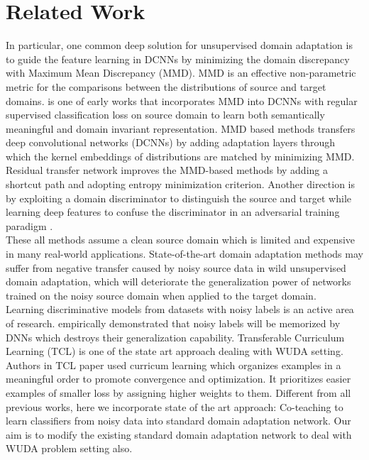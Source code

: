 \section{Related Work}
In particular, one common deep solution for unsupervised domain adaptation is to guide the feature learning in DCNNs by minimizing the domain discrepancy with Maximum Mean Discrepancy (MMD). MMD is an effective non-parametric metric for the comparisons between the distributions of source and target domains. \cite{mmd} is one of early works that incorporates MMD into DCNNs with regular supervised classification loss on source domain to learn both semantically meaningful and domain invariant representation. MMD based methods \cite{mmd,ltdan} transfers deep convolutional networks (DCNNs) by adding adaptation layers through which the kernel embeddings of distributions are matched by minimizing MMD. Residual transfer network \cite{rtn} improves the MMD-based methods by adding a shortcut path and adopting entropy minimization criterion. 
Another direction is by exploiting a domain discriminator to distinguish the source and target while learning deep features to confuse the discriminator in an adversarial training paradigm \cite{uda, dann, deeptransfer}.\\
These all methods assume a clean source domain which is limited and expensive in many real-world applications. State-of-the-art domain adaptation methods may suffer from negative transfer caused by noisy source data in wild unsupervised domain adaptation, which will deteriorate the generalization power of networks trained on the noisy source domain when applied to the target domain.\\
Learning discriminative models from datasets with noisy labels is an active area of research. \cite{DBLP:journals/corr/ZhangBHRV16} empirically demonstrated that noisy labels will be memorized by DNNs which destroys their generalization capability. Transferable Curriculum Learning (TCL) \cite{tcl} is one of the state art approach dealing with WUDA setting. Authors in TCL paper used curricum learning \cite{curricumlearn_latent, curricumlearn} which organizes examples in a meaningful order to
promote convergence and optimization. It prioritizes easier examples of smaller loss by
assigning higher weights to them. Different from all previous works, here we incorporate state of the art approach: Co-teaching \cite{coteaching} to learn classifiers from noisy data into standard domain adaptation network. Our aim is to modify the existing standard domain adaptation network to deal with WUDA problem setting also. 